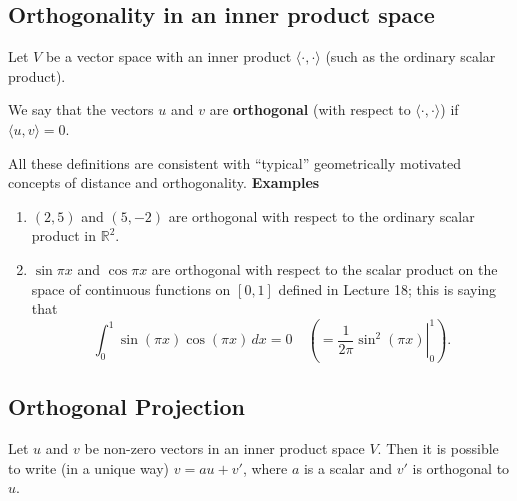 \documentclass[a4paper, 9pt]{extarticle}
\begin{document}
\subsection{Orthogonality in an inner product space}
Let $V$ be a vector space with an inner product $\langle \cdot, \cdot \rangle$ (such as the ordinary scalar product).
\begin{definitionbox}{}{}
  We say that the vectors $u$ and $v$ are \textbf{orthogonal} (with respect to $\langle \cdot, \cdot \rangle$) if $\langle u, v \rangle = 0$.
\end{definitionbox}

All these definitions are consistent with “typical” geometrically motivated concepts of distance and orthogonality.
\textbf{Examples}
\begin{enumerate}
  \item $(2, 5)$ and $(5, -2)$ are orthogonal with respect to the ordinary scalar product in $\mathbb{R}^2$.

  \item $\sin \pi x$ and $\cos \pi x$ are orthogonal with respect to the scalar product on the space of continuous functions on $[0, 1]$ defined in Lecture 18; this is saying that
        $$
          \int_0^1 \sin(\pi x) \cos(\pi x) \, dx = 0 \quad \left(= \left. \frac{1}{2\pi} \sin^2(\pi x) \right|_0^1 \right).
        $$
\end{enumerate}
\subsection{Orthogonal Projection}
\begin{lemmabox}{}{}
  Let $u$ and $v$ be non-zero vectors in an inner product space $V$.
  Then it is possible to write (in a unique way) $v = au + v'$, where $a$ is a scalar and $v'$ is orthogonal to $u$.
\end{lemmabox}
\end{document}

